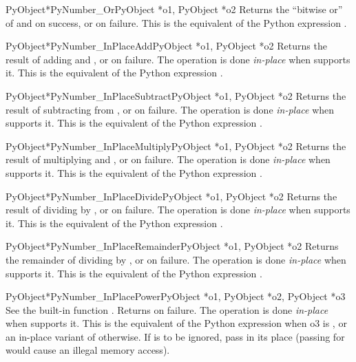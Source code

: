 \documentclass{manual}
\begin{document}
\begin{cfuncdesc}{PyObject*}{PyNumber_Or}{PyObject *o1, PyObject *o2}
Returns the ``bitwise or'' of  and  on success, or
\NULL{} on failure.  This is the equivalent of the Python expression
.
\end{cfuncdesc}


\begin{cfuncdesc}{PyObject*}{PyNumber_InPlaceAdd}{PyObject *o1, PyObject *o2}
Returns the result of adding  and , or \NULL{} on failure. 
The operation is done \emph{in-place} when  supports it.  This is the
equivalent of the Python expression .
\end{cfuncdesc}


\begin{cfuncdesc}{PyObject*}{PyNumber_InPlaceSubtract}{PyObject *o1, PyObject *o2}
Returns the result of subtracting  from , or
\NULL{} on failure.  The operation is done \emph{in-place} when 
supports it.  This is the equivalent of the Python expression .
\end{cfuncdesc}


\begin{cfuncdesc}{PyObject*}{PyNumber_InPlaceMultiply}{PyObject *o1, PyObject *o2}
Returns the result of multiplying  and , or \NULL{} on
failure.  The operation is done \emph{in-place} when  supports it. 
This is the equivalent of the Python expression .
\end{cfuncdesc}


\begin{cfuncdesc}{PyObject*}{PyNumber_InPlaceDivide}{PyObject *o1, PyObject *o2}
Returns the result of dividing  by , or \NULL{} on failure. 
The operation is done \emph{in-place} when  supports it. This is the
equivalent of the Python expression .
\end{cfuncdesc}


\begin{cfuncdesc}{PyObject*}{PyNumber_InPlaceRemainder}{PyObject *o1, PyObject *o2}
Returns the remainder of dividing  by , or \NULL{} on
failure.  The operation is done \emph{in-place} when  supports it. 
This is the equivalent of the Python expression .
\end{cfuncdesc}


\begin{cfuncdesc}{PyObject*}{PyNumber_InPlacePower}{PyObject *o1, PyObject *o2, PyObject *o3}
See the built-in function .  Returns
\NULL{} on failure.  The operation is done \emph{in-place} when 
supports it.  This is the equivalent of the Python expression  when o3 is , or an in-place variant of
 otherwise. If  is to be
ignored, pass  in its place (passing \NULL{} for 
would cause an illegal memory access).
\end{cfuncdesc}
\end{document}
